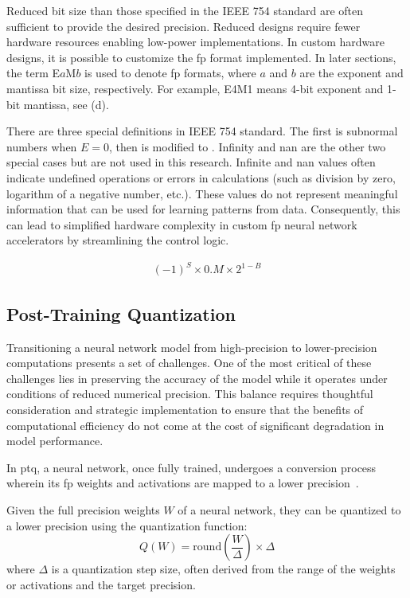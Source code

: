 Reduced bit size than those specified in the IEEE 754 standard are often sufficient to provide the desired precision. Reduced designs require fewer hardware resources enabling low-power implementations. In custom hardware designs, it is possible to customize the \gls{fp} format implemented. In later sections, the term E$a$M$b$ is used to denote \gls{fp} formats, where $a$ and $b$ are the exponent and mantissa bit size, respectively. For example, E4M1 means 4-bit exponent and 1-bit mantissa, see (d).

There are three special definitions in IEEE 754 standard. The first is subnormal numbers when $E=0$, then  is modified to . Infinity and \gls{nan} are the other two special cases but are not used in this research. Infinite and \gls{nan} values often indicate undefined operations or errors in calculations (such as division by zero, logarithm of a negative number, etc.). These values do not represent meaningful information that can be used for learning patterns from data. Consequently, this can lead to simplified hardware complexity in custom \gls{fp} neural network accelerators by streamlining the control logic.

\begin{eqnarray} \label{eq:float_subnorm}
(-1)^{S} \times 0.M \times 2^{1-B}
\end{eqnarray}

\subsection{Post-Training Quantization}
Transitioning a neural network model from high-precision to lower-precision computations presents a set of challenges. One of the most critical of these challenges lies in preserving the accuracy of the model while it operates under conditions of reduced numerical precision. This balance requires thoughtful consideration and strategic implementation to ensure that the benefits of computational efficiency do not come at the cost of significant degradation in model performance.

In \gls{ptq}, a neural network, once fully trained, undergoes a conversion process wherein its \gls{fp} weights and activations are mapped to a lower precision~\cite{krishnamoorthi2018quantizing}.

Given the full precision weights \( W \) of a neural network, they can be quantized to a lower precision using the quantization function:
\begin{equation}
Q(W) = \text{round}\left(\frac{W}{\Delta}\right) \times \Delta
\end{equation}
where \( \Delta \) is a quantization step size, often derived from the range of the weights or activations and the target precision.

